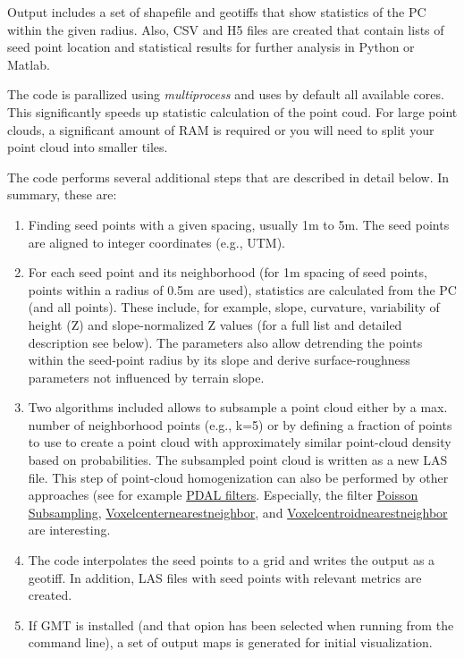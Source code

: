 \documentclass[a4paperpaper,,tablecaptionabove]{scrartcl}
\begin{document}
Output includes a set of shapefile and geotiffs that show statistics of
the PC within the given radius. Also, CSV and H5 files are created that
contain lists of seed point location and statistical results for further
analysis in Python or Matlab.

The code is parallized using \emph{multiprocess} and uses by default all
available cores. This significantly speeds up statistic calculation of
the point coud. For large point clouds, a significant amount of RAM is
required or you will need to split your point cloud into smaller tiles.

The code performs several additional steps that are described in detail
below. In summary, these are:

\begin{enumerate}
\def\labelenumi{\arabic{enumi}.}
\item
  Finding seed points with a given spacing, usually 1m to 5m. The seed
  points are aligned to integer coordinates (e.g., UTM).
\item
  For each seed point and its neighborhood (for 1m spacing of seed
  points, points within a radius of 0.5m are used), statistics are
  calculated from the PC (and all points). These include, for example,
  slope, curvature, variability of height (Z) and slope-normalized Z
  values (for a full list and detailed description see below). The
  parameters also allow detrending the points within the seed-point
  radius by its slope and derive surface-roughness parameters not
  influenced by terrain slope.
\item
  Two algorithms included allows to subsample a point cloud either by a
  max. number of neighborhood points (e.g., k=5) or by defining a
  fraction of points to use to create a point cloud with approximately
  similar point-cloud density based on probabilities. The subsampled
  point cloud is written as a new LAS file. This step of point-cloud
  homogenization can also be performed by other approaches (see for
  example \href{https://pdal.io/stages/filters.html}{PDAL filters}.
  Especially, the filter
  \href{https://pdal.io/stages/filters.sample.html\#filters-sample}{Poisson
  Subsampling},
  \href{https://pdal.io/stages/filters.voxelcenternearestneighbor.html?highlight=voxel\%20centroid}{Voxelcenternearestneighbor},
  and
  \href{https://pdal.io/stages/filters.voxelcentroidnearestneighbor.html?highlight=voxel\%20centroid}{Voxelcentroidnearestneighbor}
  are interesting.
\item
  The code interpolates the seed points to a grid and writes the output
  as a geotiff. In addition, LAS files with seed points with relevant
  metrics are created.
\item
  If GMT is installed (and that opion has been selected when running
  from the command line), a set of output maps is generated for initial
  visualization.
\end{enumerate}
\end{document}
